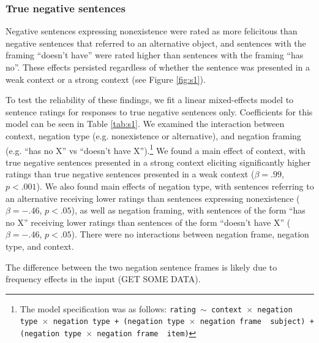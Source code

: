 \documentclass[10pt,letterpaper]{article}
\begin{document}
\subsubsection{True negative sentences}

Negative sentences expressing nonexistence were rated as more felicitous than negative sentences that referred to an alternative object, and sentences with the framing ``doesn't have'' were rated higher than sentences with the framing ``has no''.  These effects persisted regardless of whether the sentence was presented in a weak context or a strong context (see Figure \ref{fig:s1}).  

To test the reliability of these findings, we fit a linear mixed-effects model to sentence ratings for responses to true negative sentences only.  Coefficients for this model can be seen in Table \ref{tab:s1}.  We examined the interaction between context, negation type (e.g. nonexistence or alternative), and negation framing (e.g. ``has no X'' vs ``doesn't have X'').\footnote{ The model specification was as follows: \texttt{rating $\sim$ context~$\times$~negation type~$\times$~negation type + (negation type~$\times$~negation frame~\textbar~subject) +  (negation type~$\times$~negation frame~\textbar~item)}} We found a main effect of context, with true negative sentences presented in a strong context eliciting significantly higher ratings than true negative sentences presented in a weak context ($\beta= .99$, $p< .001$).  We also found main effects of negation type, with sentences referring to an alternative receiving lower ratings than sentences expressing nonexistence ($\beta= -.46$, $p< .05$), as well as negation framing, with sentences of the form ``has no X'' receiving lower ratings than sentences of the form ``doesn't have X''  ($\beta= -.46$, $p< .05$).  There were no interactions between negation frame, negation type, and context.  

The difference between the two negation sentence frames is likely due to frequency effects in the input (GET SOME DATA). 
\end{document}
